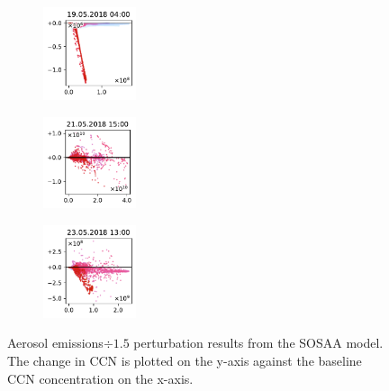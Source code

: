 \begin{figure}[H]
    \begin{subfigure}
        \centering
        \includegraphics[width=0.30\textwidth,valign=t]{evaluation/figures/perturbations/perturbation-19.05.2018:04.00-aerosols-div-1.5.pdf}
    \end{subfigure}
    \begin{subfigure}
        \centering
        \includegraphics[width=0.30\textwidth,valign=t]{evaluation/figures/perturbations/perturbation-21.05.2018:15.00-aerosols-div-1.5.pdf}
    \end{subfigure}
    \begin{subfigure}
        \centering
        \includegraphics[width=0.30\textwidth,valign=t]{evaluation/figures/perturbations/perturbation-23.05.2018:13.00-aerosols-div-1.5.pdf}
    \end{subfigure}

    \caption[Aerosol emissions$\div 1.5$ perturbation SOSAA results]{Aerosol emissions$\div 1.5$ perturbation results from the SOSAA model. The change in CCN is plotted on the y-axis against the baseline CCN concentration on the x-axis.}
    \label{fig:sosaa-perturbation-aerosols-div-1.5}
\end{figure}

